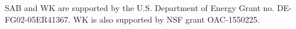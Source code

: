 \documentclass[aps, prc, reprint, amsmath, groupedaddress, nofootinbib]{revtex4-1}
\begin{document}
\begin{acknowledgments}
SAB and WK  are supported by the U.S. Department of Energy Grant no. DE-FG02-05ER41367. WK is also supported by NSF grant OAC-1550225.
\end{acknowledgments}

\begin{appendices}
\end{appendices}
 
\end{document}
